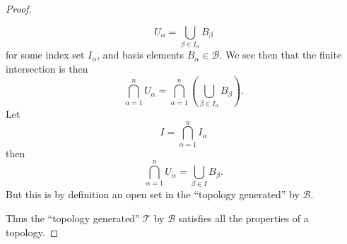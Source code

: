 \begin{proof}
\begin{enumerate}
\begin{equation}
  U_{\alpha} = \bigcup_{\beta\in I_{\alpha}}B_{\beta}
\end{equation}
for some index set $I_{\alpha}$, and basis elements
  $B_{\alpha}\in\mathscr{B}$. We see then that the finite
  intersection is then
\begin{equation}%
  \bigcap_{\alpha=1}^{n}U_{\alpha} = \bigcap_{\alpha=1}^{n}\left(\bigcup_{\beta\in I_{\alpha}}B_{\beta}\right).
\end{equation}
Let
\begin{equation}%
  I = \bigcap_{\alpha=1}^{n}I_{\alpha}
\end{equation}
then
\begin{equation}%
  \bigcap_{\alpha=1}^{n}U_{\alpha} = \bigcup_{\beta\in I}B_{\beta}.
\end{equation}
But this is by definition an open set in the ``topology
generated'' by $\mathscr{B}$.
\end{enumerate}
Thus the ``topology generated'' $\mathcal{T}$ by $\mathscr{B}$
satisfies all the properties of a topology. 
\end{proof}

